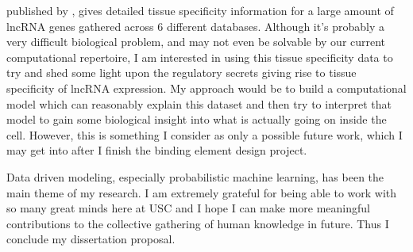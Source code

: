published by \citet{seifuddin2020lncrnakb}, gives detailed tissue specificity information  for a large
amount of lncRNA genes gathered across 6 different databases. Although it's probably a very
difficult biological problem, and may not even be solvable by our current computational
repertoire, I am interested in using this tissue specificity data to try and shed some light
upon the regulatory secrets giving rise to tissue specificity of lncRNA expression. My approach
would be to build a computational model which can reasonably explain this dataset and then try to
interpret that model to gain some biological insight into what is actually going on inside the cell. 
However, this is something I consider as only a possible future work, which I may get into after I finish the binding
element design project. 

Data driven modeling, especially probabilistic machine learning, has been the main theme of my
research. I am extremely grateful for being able to work with so many great minds here at USC and I
hope I can make more meaningful contributions to the collective gathering of human knowledge in
future. Thus I conclude my dissertation proposal.
